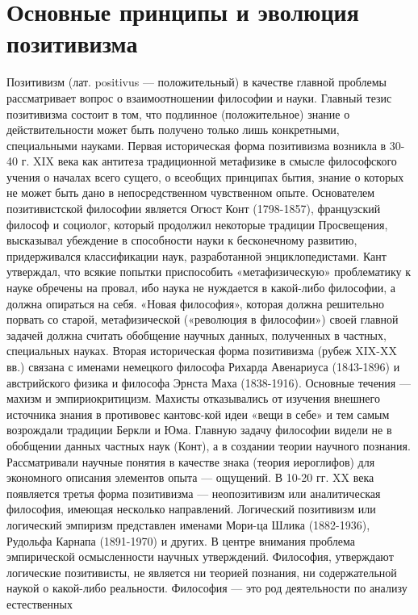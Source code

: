 \documentclass[12pt]{article}
\begin{document}
\section{Основные принципы и эволюция позитивизма}
Позитивизм  (лат.  positivus  —  положительный)  в  качестве  главной  проблемы  рассматривает  вопрос  о
взаимоотношении  философии  и  науки.  Главный  тезис  позитивизма  состоит  в  том,  что  подлинное
(положительное) знание о действительности может быть получено только лишь конкретными, специальными
науками.
Первая историческая форма позитивизма возникла в 30-40 г. XIX века как антитеза традиционной метафизике в
смысле философского учения о началах всего сущего, о всеобщих принципах бытия, знание о которых не может
быть дано в непосредственном чувственном опыте. Основателем позитивистской философии является Огюст
Конт (1798-1857), французский философ и социолог, который продолжил некоторые традиции Просвещения,
высказывал убеждение в способности науки к бесконечному развитию, придерживался классификации наук,
разработанной энциклопедистами.
Кант утверждал, что всякие попытки приспособить «метафизическую» проблематику к науке обречены на
провал, ибо наука не нуждается в какой-либо философии, а должна опираться на себя. «Новая философия»,
которая должна решительно порвать со старой, метафизической («революция в философии») своей главной
задачей должна считать обобщение научных данных, полученных в частных, специальных науках.
Вторая историческая форма позитивизма (рубеж XIX-XX вв.) связана с именами немецкого философа Рихарда
Авенариуса (1843-1896) и австрийского физика и философа Эрнста Маха (1838-1916). Основные течения —
махизм и эмпириокритицизм. Махисты отказывались от изучения внешнего источника знания в противовес
кантовс-кой идеи «вещи в себе» и тем самым возрождали традиции Беркли и Юма. Главную задачу философии
видели не в обобщении данных частных наук (Конт), а в создании теории научного познания. Рассматривали
научные  понятия  в  качестве  знака  (теория  иероглифов)  для  экономного  описания  элементов  опыта  —
ощущений.
В 10-20 гг. XX века появляется третья форма позитивизма — неопозитивизм или аналитическая философия,
имеющая несколько направлений.
Логический позитивизм или логический эмпиризм представлен именами Мори-ца Шлика (1882-1936), Рудольфа
Карнапа  (1891-1970)  и  других.  В  центре  внимания  проблема  эмпирической  осмысленности  научных
утверждений.  Философия,  утверждают  логические  позитивисты,  не  является  ни  теорией  познания,  ни
содержательной наукой о какой-либо реальности. Философия — это род деятельности по анализу естественных
\end{document}
